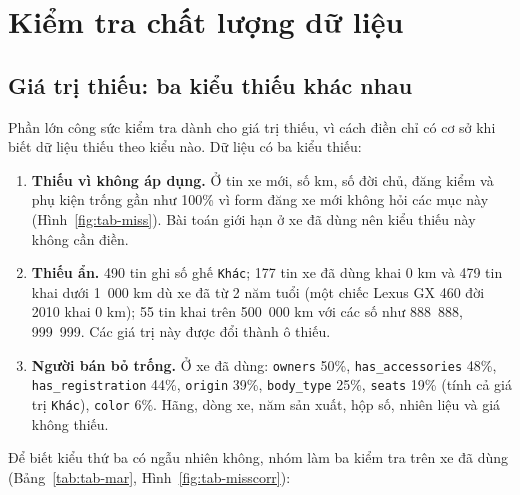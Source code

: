 
\section{Kiểm tra chất lượng dữ liệu}\label{sec:tab-quality}

\subsection{Giá trị thiếu: ba kiểu thiếu khác nhau}

Phần lớn công sức kiểm tra dành cho giá trị thiếu, vì cách điền chỉ có cơ sở khi biết dữ liệu thiếu theo kiểu nào.
Dữ liệu có ba kiểu thiếu:

\begin{enumerate}
  \item \textbf{Thiếu vì không áp dụng.} Ở tin xe mới, số km, số đời chủ, đăng kiểm và phụ kiện trống gần như 100\% vì
        form đăng xe mới không hỏi các mục này (Hình~\ref{fig:tab-miss}). Bài toán giới hạn ở xe đã dùng nên kiểu thiếu
        này không cần điền.
  \item \textbf{Thiếu ẩn.} 490 tin ghi số ghế \texttt{Khác}; 177 tin xe đã dùng khai 0 km và 479 tin khai dưới 1~000 km
        dù xe đã từ 2 năm tuổi (một chiếc Lexus GX 460 đời 2010 khai 0 km); 55 tin khai trên 500~000 km với các số như
        888~888, 999~999. Các giá trị này được đổi thành ô thiếu.
  \item \textbf{Người bán bỏ trống.} Ở xe đã dùng: \texttt{owners} 50\%, \texttt{has\_accessories} 48\%,
        \texttt{has\_registration} 44\%, \texttt{origin} 39\%, \texttt{body\_type} 25\%, \texttt{seats} 19\% (tính cả
        giá trị \texttt{Khác}), \texttt{color} 6\%. Hãng, dòng xe, năm sản xuất, hộp số, nhiên liệu và giá không thiếu.
\end{enumerate}


Để biết kiểu thứ ba có ngẫu nhiên không, nhóm làm ba kiểm tra trên xe đã dùng (Bảng~\ref{tab:tab-mar},
Hình~\ref{fig:tab-misscorr}):

